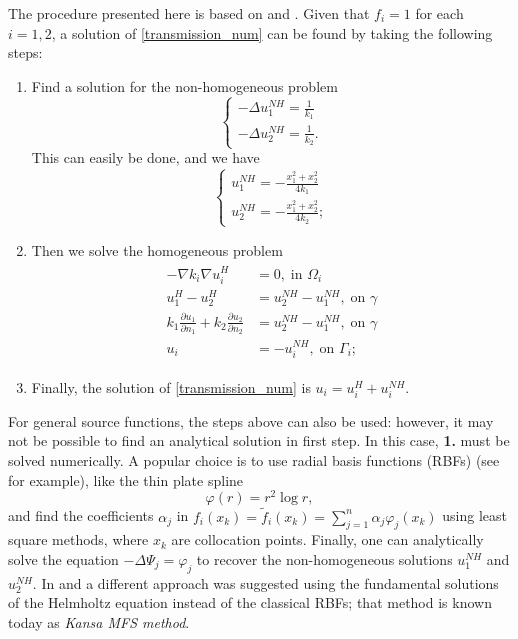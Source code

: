 The procedure presented here is based on \cite{alves2005new} and \cite{alves2021domain}. Given that \(f_i = 1\) for each \(i=1, 2\), a solution of \eqref{transmission_num} can be found by taking the following steps:
\begin{enumerate}
    \item Find a solution for the non-homogeneous problem
    \[
        \begin{cases}
            -\Delta u_1^{NH} = \frac{1}{k_1}\\
            -\Delta u_2^{NH} = \frac{1}{k_2}.
        \end{cases}
    \]
    This can easily be done, and we have
    \[
        \begin{cases}
            u_1^{NH} = -\frac{x_1^2 + x_2^2}{4k_1}\\
            u_2^{NH} = -\frac{x_1^2 + x_2^2}{4k_2};
        \end{cases}
    \]
    \item Then we solve the homogeneous problem
    \begin{align}\label{transmission_num_homo}
        \begin{split}
        - \nabla k_i \nabla u_i^H &= 0, \; \text{in }\Omega_i\\
        u_1^H - u_2^H &= u_2^{NH}- u_1^{NH}, \; \text{on }\gamma\\
        k_1 \frac{\partial u_1}{\partial n_1} + k_2 \frac{\partial u_2}{\partial n_2} &= u_2^{NH} - u_1^{NH}, \; \text{on }\gamma\\
        u_i &= - u_i^{NH}, \; \text{on }\Gamma_i;
        \end{split}
    \end{align}
    \item Finally, the solution of \eqref{transmission_num} is \(u_i = u_i^H + u_i^{NH}\).
\end{enumerate}
For general source functions, the steps above can also be used: however, it may not be possible to find an analytical solution in first step. In this case, \textbf{1.} must be solved numerically. A popular choice is to use radial basis functions (RBFs) (see \cite{golberg1996improved} for example), like the thin plate spline
\[
    \varphi(r) = r^2 \log r,     
\]
and find the coefficients \(\alpha_j\) in \(f_i(x_k) = \tilde{f}_i(x_k) = \sum_{j=1}^{n} \alpha_j \varphi_j(x_k)\) using least square methods, where \(x_k\) are collocation points. Finally, one can analytically solve the equation \(-\Delta \Psi_j = \varphi_j\) to recover the non-homogeneous solutions \(u_1^{NH}\) and \(u_2^{NH}\). In \cite{alves2005new} and \cite{alves2021domain} a different approach was suggested using the fundamental solutions of the Helmholtz equation instead of the classical RBFs; that method is known today as \textit{Kansa MFS method}.

